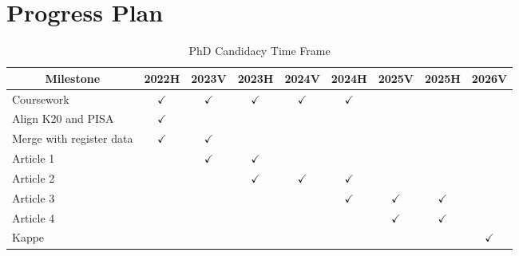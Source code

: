 \documentclass[
    a4paper,                %
    11pt,                   %
    stu,                    %
    donotrepeattitle,       %
    floatsintext,           %
    biblatex,               %
    colorlinks=true,        %
    linkcolor=red,          %
    anchorcolor=black,      %
    citecolor=blue,         %
    urlcolor=blue,          %
    bookmarks=true,         %
    bookmarksopen=false,    %
    bookmarksnumbered=true, %
    dvipsnames              %
]{apa7}
\begin{document}
\section{Progress Plan}

\begin{table}[htbp]
    \begin{threeparttable}
    \caption{PhD Candidacy Time Frame}
    \label{tab:timeframe}
    \begin{tabular}{lcccccccc}
        \toprule
        \multicolumn{1}{c}{Milestone} & 2022H & 2023V & 2023H & 2024V & 2024H & 2025V & 2025H & 2026V \\
        \midrule
        Coursework & $\checkmark$     & $\checkmark$     & $\checkmark$     & $\checkmark$      & $\checkmark$      &       &       &  \\
        Align K20 and PISA & $\checkmark$     &       &       &       &       &       &       &  \\
        Merge with register data & $\checkmark$     & $\checkmark$     &       &       &       &       &       &  \\
        Article 1 &       & $\checkmark$     & $\checkmark$     &       &       &       &       &  \\
        Article 2 &       &       & $\checkmark$     & $\checkmark$     & $\checkmark$     &       &       &  \\
        Article 3 &       &       &       &       & $\checkmark$     & $\checkmark$     & $\checkmark$     &  \\
        Article 4 &       &       &       &       &       & $\checkmark$     & $\checkmark$     &  \\
        Kappe &       &       &       &       &       &       &       & $\checkmark$ \\
        \bottomrule
        \end{tabular}
    \end{threeparttable}
\end{table}

\printbibliography
\end{document}
